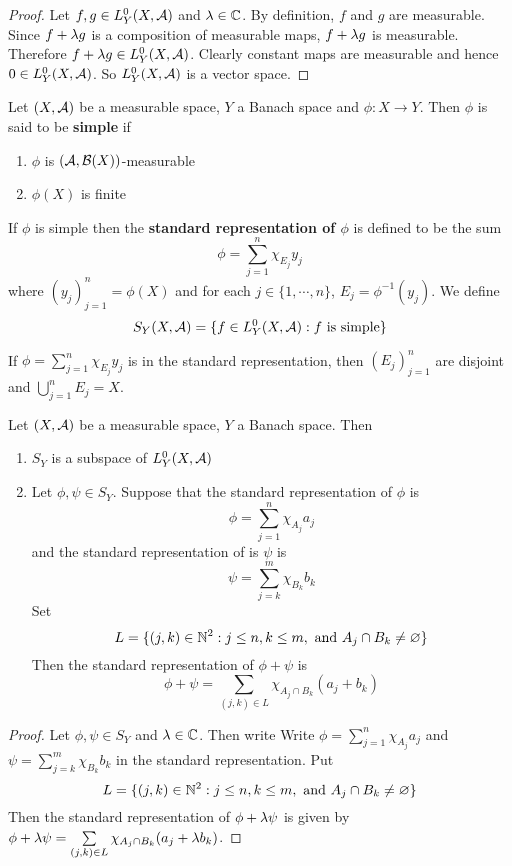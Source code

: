 \documentclass{book}
\begin{document}
	\begin{proof}
	Let $f, g \in L_Y^0(X, \mathcal{A})$ and $\lambda \in \mathbb{C}$. By definition, $f$ and $g$ are measurable. Since $f+\lambda g $ is a composition of measurable maps, $f + \lambda g$ is measurable. Therefore $f + \lambda g \in L_Y^0(X, \mathcal{A})$. Clearly constant maps are measurable and hence $0 \in L_Y^0(X, \mathcal{A})$. So $L_Y^0(X, \mathcal{A})$ is a vector space. 
	\end{proof}

	\begin{defn}  
		Let $(X, \mathcal{A})$ be a measurable space, $Y$ a Banach space and $\phi: X \rightarrow Y$. Then $\phi$ is said to be \textbf{simple} if 
		\begin{enumerate}
			\item $\phi$ is $(\mathcal{A}, \mathcal{B}(X))$-measurable
			\item $\phi(X)$ is finite
		\end{enumerate}
		If $\phi$ is simple then the \textbf{standard representation of $\phi$} is defined to be the sum $$\phi = \sum\limits_{j=1}^n \chi_{E_j}y_j$$ where $(y_j)_{j=1}^n = \phi(X)$ and for each $j \in \{1, \cdots, n\}$, $E_j = \phi^{-1}(y_j)$. We define $$S_Y(X, \mathcal{A}) = \{f \in L_Y^0(X, \mathcal{A}): f \text{ is simple}\}$$
	\end{defn}
	
	\begin{note}
		If $\phi = \sum\limits_{j=1}^n \chi_{E_j}y_j$ is in the standard representation, then $(E_j)_{j=1}^n$ are disjoint and $\bigcup\limits_{j=1}^n E_j = X$.
	\end{note}

	\begin{ex}
		Let $(X, \mathcal{A})$ be a measurable space, $Y$ a Banach space. Then 
		\begin{enumerate}
			\item $S_Y $ is a subspace of $L^0_Y(X, \mathcal{A})$
			\item Let $\phi, \psi \in S_Y$. Suppose that the standard representation of $\phi$ is 
			$$\phi = \sum\limits_{j=1}^n\chi_{A_j}a_j$$ 
			and the standard representation of is $\psi$ is 
			$$\psi = \sum\limits_{j=k}^m\chi_{B_k}b_k$$ 
			Set
			$$L = \{(j,k) \in \mathbb{N}^2: j \leq n, k \leq m, \text{ and } A_j \cap B_k \neq \varnothing\}$$  
			Then the standard representation of $\phi + \psi$ is 
			$$\phi + \psi = \sum\limits_{(j,k) \in L} \chi_{A_j \cap B_k}(a_j + b_k)$$
		\end{enumerate} 
	\end{ex}

	\begin{proof}
		Let $\phi, \psi \in S_Y$ and $\lambda \in \mathbb{C}$. Then write Write $\phi = \sum\limits_{j=1}^n\chi_{A_j}a_j$ and $\psi = \sum\limits_{j=k}^m\chi_{B_k}b_k$ in the standard representation. Put $$L = \{(j,k) \in \mathbb{N}^2: j \leq n, k \leq m, \text{ and } A_j \cap B_k \neq \varnothing\}$$ 
		Then the standard representation of $\phi + \lambda \psi$ is given by  $\phi + \lambda \psi = \sum\limits_{(j,k) \in L} \chi_{A_j \cap B_k}(a_j + \lambda b_k)$.
		
	\end{proof}
	
\end{document}
